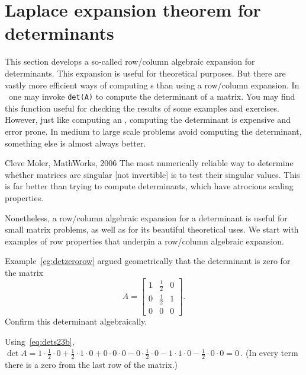 

\section{Laplace expansion theorem for determinants}
\label{sec:apd}
\secttoc


This section develops a so-called row\slash column algebraic expansion for determinants. 
This expansion is useful for theoretical purposes.
But there are vastly more efficient ways of computing s than using a row\slash column expansion.  
In \script\ one may invoke \verb|det(A)| to compute the determinant of a matrix.
You may find this function useful for checking the results of some examples and exercises.
However, just like computing an , computing the determinant is expensive and error prone.  
In medium to large scale problems avoid computing the determinant, something else is almost always better.

\begin{quoted}{Cleve Moler, MathWorks, 2006}
The most numerically reliable way to determine whether matrices are singular [not invertible] is to test their singular values. 
This is far better than trying to compute determinants, which have atrocious scaling properties.
\end{quoted}

Nonetheless, a row\slash column algebraic expansion for a determinant is useful for small matrix problems, as well as for its beautiful  theoretical uses.
We start with examples of row properties that underpin a row\slash column algebraic expansion.





\begin{example} \label{eg:detzerorowii}
Example~\ref{eg:detzerorow} argued geometrically that the determinant is zero for the matrix
\begin{equation*}
A=\begin{bmatrix} 1&\frac12&0
\\0&\frac12&1 \\0&0&0 \end{bmatrix}.
\end{equation*}
Confirm this determinant algebraically.
\begin{solution} 
Using~\eqref{eq:dets23b}, \(\det A
=1\cdot\frac12\cdot0+\frac12\cdot1\cdot0+0\cdot0\cdot0
-0\cdot\frac12\cdot0-1\cdot1\cdot0-\frac12\cdot0\cdot0
=0\)\,.  (In every term there is a zero from the last row of the matrix.)
\end{solution}
\end{example}


